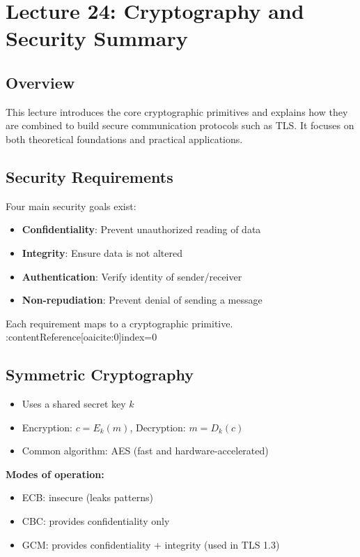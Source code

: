 \section{Lecture 24: Cryptography and Security Summary}

\subsection{Overview}
This lecture introduces the core cryptographic primitives and explains how they are combined to build secure communication protocols such as TLS. It focuses on both theoretical foundations and practical applications.

\subsection{Security Requirements}
Four main security goals exist:
\begin{itemize}
    \item \textbf{Confidentiality}: Prevent unauthorized reading of data
    \item \textbf{Integrity}: Ensure data is not altered
    \item \textbf{Authentication}: Verify identity of sender/receiver
    \item \textbf{Non-repudiation}: Prevent denial of sending a message
\end{itemize}

Each requirement maps to a cryptographic primitive. :contentReference[oaicite:0]{index=0}

\subsection{Symmetric Cryptography}
\begin{itemize}
    \item Uses a shared secret key $k$
    \item Encryption: $c = E_k(m)$, Decryption: $m = D_k(c)$
    \item Common algorithm: AES (fast and hardware-accelerated)
\end{itemize}

\textbf{Modes of operation:}
\begin{itemize}
    \item ECB: insecure (leaks patterns)
    \item CBC: provides confidentiality only
    \item GCM: provides confidentiality + integrity (used in TLS 1.3)
\end{itemize}

